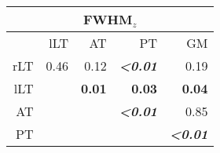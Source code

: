 \begin{table}
{\begin{minipage}{\linewidth}
\begin{tabular}{rrrrr}
				\multicolumn{5}{c}{\textbf{FWHM$_{z}$}}\\
				\toprule
		              & lLT   & AT    & PT    & GM \\
		        \midrule
		        rLT   & 0.46  & 0.12  & \textbf{\emph{<0.01}}  & 0.19 \\
		        lLT   &       & \textbf{0.01}  & \textbf{0.03}  & \textbf{0.04} \\
		        AT    &       &       & \textbf{\emph{<0.01}}  & 0.85 \\
		        PT    &       &       &       & \textbf{\emph{<0.01}} \\
		        \bottomrule
		        \end{tabular}%
	 \end{minipage}%
	 \label{tab:chap5exp2_qsi single ttest}%
  }
  \label{tab:chapter6 single ttest}%
  \end{table}

